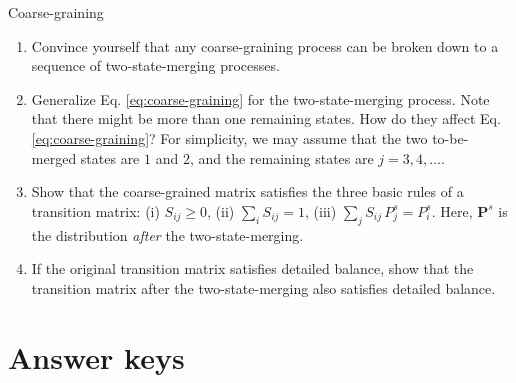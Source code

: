 \documentclass[12pt]{article}
\begin{document}
\begin{problem}{Coarse-graining}
\begin{enumerate}
  \item
  Convince yourself that any coarse-graining process
  can be broken down to a sequence
  of two-state-merging processes.

  \item
  Generalize
  Eq. \eqref{eq:coarse-graining}
  for the two-state-merging process.
  Note that there might be more than one
  remaining states.
  How do they affect
  Eq. \eqref{eq:coarse-graining}?
  For simplicity, we may assume that
  the two to-be-merged states are $1$ and $2$,
  and the remaining states are $j = 3, 4, \dots$.

  \item
  Show that the coarse-grained matrix satisfies
  the three basic rules of a transition matrix:
  (i) $S_{ij} \ge 0$,
  (ii) $\sum_i S_{ij} = 1$,
  (iii) $\sum_j S_{ij} \, P^s_j = P^s_i$.
  Here, $\mathbf P^s$ is the distribution
  \emph{after} the two-state-merging.

  \item
  If the original transition matrix satisfies detailed balance,
  show that the transition matrix after the two-state-merging
  also satisfies detailed balance.
\end{enumerate}

\end{problem}





\section{Answer keys}
\end{document}
